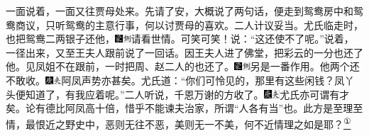 一面说着，一面又往贾母处来。先请了安，大概说了两句话，便走到鸳鸯房中和鸳鸯商议，只听鸳鸯的主意行事，何以讨贾母的喜欢。二人计议妥当。尤氏临走时，也把鸳鸯二两银子还他，{\includegraphics[width=3mm]{../Images/00006}\includegraphics[width=3mm]{../Images/00011}\footnotesize \kaishu 请看世情。可笑可笑！}说：``这还使不了呢。''说着，一径出来，又至王夫人跟前说了一回话。因王夫人进了佛堂，把彩云的一分也还了他。见凤姐不在跟前，一时把周、赵二人的也还了。{\includegraphics[width=3mm]{../Images/00006}\includegraphics[width=3mm]{../Images/00011}\footnotesize \kaishu 另是一番作用。}他两个还不敢收。{\includegraphics[width=3mm]{../Images/00004}\includegraphics[width=3mm]{../Images/00012}\footnotesize \kaishu 阿凤声势亦甚矣。}尤氏道：``你们可怜见的，那里有这些闲钱？凤丫头便知道了，有我应着呢。''二人听说，千恩万谢的方收了。{\includegraphics[width=3mm]{../Images/00004}\includegraphics[width=3mm]{../Images/00012}\footnotesize \kaishu 尤氏亦可谓有才矣。论有德比阿凤高十倍，惜乎不能谏夫治家，所谓``人各有当''也。此方是至理至情，最恨近之野史中，恶则无往不恶，美则无一不美，何不近情理之如是耶？}\href{../Text/part0047_split_000.html\#lnkback_1_a}{\textsuperscript{①}}

